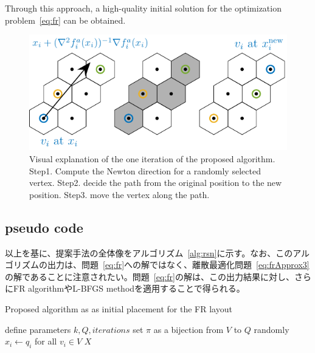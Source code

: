 \documentclass[dvipdfmx,lettersize,journal]{IEEEtran}
\begin{document}
Through this approach, a high-quality initial solution for the optimization problem~\eqref{eq:fr} can be obtained.

\begin{figure}[t]
  \centering
  \includegraphics[width=\columnwidth]{hex.pdf}
  \caption{Visual explanation of the one iteration of the proposed algorithm. Step1. Compute the Newton direction for a randomly selected vertex. Step2. decide the path from the original position to the new position. Step3. move the vertex along the path.}
  \label{fig:hex}
\end{figure}

\subsection{pseudo code}\label{ssec:pseudoCode}

以上を基に、提案手法の全体像をアルゴリズム~\ref{alg:rsn}に示す。なお、このアルゴリズムの出力は、問題~\eqref{eq:fr}への解ではなく、離散最適化問題~\eqref{eq:frApprox3}の解であることに注意されたい。問題~\eqref{eq:fr}の解は、この出力結果に対し、さらにFR algorithmやL-BFGS methodを適用することで得られる。

\begin{algorithm}[ht]
  \caption{Proposed algorithm as as initial placement for the FR layout}
  \label{alg:rsn}

  define parameters $k, Q, \textit{iterations}$\;
  set $\pi$ as a bijection from $V$ to $Q$ randomly\;
  $x_i \gets q_i$ for all $v_i \in V$\;
  \Return $X$
\end{algorithm}
\end{document}
